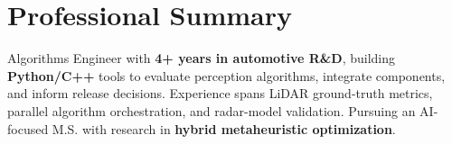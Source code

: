 \section*{Professional Summary}
\begin{center}
    \begin{minipage}{0.97\textwidth}
        \small{Algorithms Engineer with \textbf{4+ years in automotive R\&D}, building \textbf{Python/C++} tools to evaluate perception algorithms, integrate components, and inform release decisions. Experience spans LiDAR ground-truth metrics, parallel algorithm orchestration, and radar-model validation. Pursuing an AI-focused M.S. with research in \textbf{hybrid metaheuristic optimization}.}
    \end{minipage}
\end{center}
\vspace{-5pt}